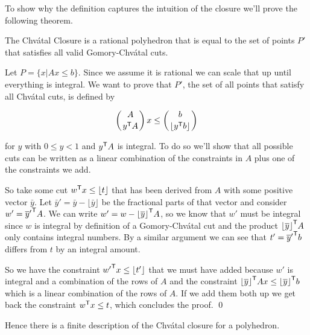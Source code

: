 To show why the definition captures the intuition of the closure we'll prove the following theorem.

\begin{thm} The Chv\'{a}tal Closure is a rational polyhedron that is equal to the set of points $P'$ that satisfies all valid Gomory-Chv\'atal cuts.\end{thm}

\begin{pr} Let $P=\{x|Ax\leq b\}$. Since we assume it is rational we can scale that up until everything is integral. We want to prove that $P'$, the set of all points that satisfy all Chv\'atal cuts, is defined by

\[\left({A}\atop{{y}^\text{\upshape \sffamily T} A}\right) x \leq \left({b}\atop {\lfloor {y}^\text{\upshape \sffamily T} b\rfloor}\right)\]

for $y$ with $0\leq y < 1$ and ${y}^\text{\upshape \sffamily T} A$ is integral. To do so we'll show that all possible cuts can be written as a linear combination of the constraints in $A$ plus one of the constraints we add.

So take some cut ${w}^\text{\upshape \sffamily T} x \leq \lfloor t\rfloor$ that has been derived from $A$ with some positive vector $\bar y$. Let $\bar y'= \bar y - \lfloor \bar y\rfloor$ be the fractional parts of that vector and consider $w'={\overline y'}^\text{\upshape \sffamily T}A$. We can write $w'=w-{\lfloor \overline y \rfloor}^\text{\upshape \sffamily T}A$, so we know that $w'$ must be integral since $w$ is integral by definition of a Gomory-Chv\'atal cut and the product ${\lfloor \overline y \rfloor}^\text{\upshape \sffamily T}A$ only contains integral numbers. By a similar argument we can see that $t' = {\overline y'}^\text{\upshape \sffamily T}b$ differs from $t$ by an integral amount.

So we have the constraint ${w'}^\text{\upshape \sffamily T}x\leq \lfloor t'\rfloor$ that we must have added because $w'$ is integral and a combination of the rows of $A$ and the constraint ${\lfloor \overline y \rfloor}^\text{\upshape \sffamily T} Ax\leq {\lfloor \overline y\rfloor}^\text{\upshape \sffamily T} b$ which is a linear combination of the rows of $A$. If we add them both up we get back the constraint ${w}^\text{\upshape \sffamily T} x\leq t$, which concludes the proof.
\qed \end{pr}

Hence there is a finite description of the Chv\'atal closure for a polyhedron.